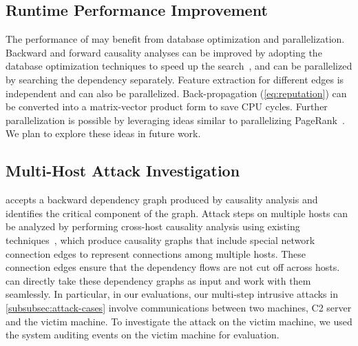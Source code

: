 \subsection{Runtime Performance Improvement}
The performance of \tool may benefit from database optimization and parallelization. 
Backward and forward causality analyses can be improved by adopting the database optimization techniques to speed up the search~\cite{gao2018aiql,gao2018saql},
and can be parallelized by searching the dependency separately. 
Feature extraction for different edges is independent and can also be parallelized.
Back-propagation (\cref{eq:reputation}) can be converted into a matrix-vector product form to save CPU cycles.
Further parallelization is possible by leveraging ideas similar to parallelizing PageRank~\cite{gleich2004fast,kohlschutter2006efficient}. 
We plan to explore these ideas in future work.


\subsection{Multi-Host Attack Investigation}
\tool accepts a backward dependency graph produced by causality analysis and identifies the critical component of the graph.
Attack steps on multiple hosts can be analyzed by performing cross-host causality analysis using existing techniques~\cite{liu2018priotracker,backtracking2},
which produce causality graphs that include special network connection edges to represent connections among multiple hosts.
These connection edges ensure that the dependency flows are not cut off across hosts. 
\tool can directly take these dependency graphs as input and work with them seamlessly. 
In particular, in our evaluations, our multi-step intrusive attacks in \cref{subsubsec:attack-cases} involve communications between two machines, C2 server and the victim machine. 
To investigate the attack on the victim machine, we used the system auditing events on the victim machine for evaluation.



